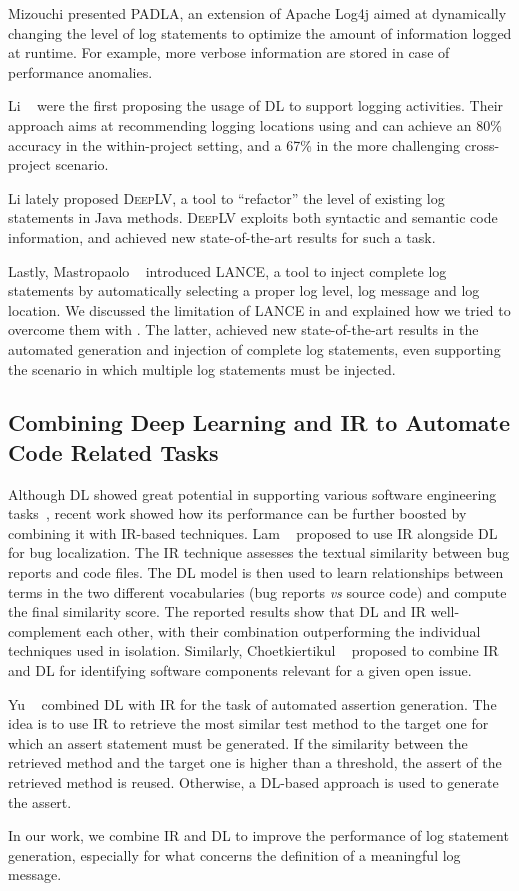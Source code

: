 Mizouchi \etal \cite{mizouchi2019padla} presented \textsc{PADLA}, an extension of Apache Log4j aimed at dynamically changing the level of log statements to optimize the amount of information logged at runtime. For example, more verbose information are stored in case of performance anomalies.

Li \etal~\cite{li2020shall} were the first proposing the usage of DL to support logging activities. Their approach aims at recommending logging locations using and can achieve an 80\% accuracy in the within-project setting, and a 67\% in the more challenging cross-project scenario.

Li \etal \cite{li2021deeplv} lately proposed \textsc{DeepLV}, a tool to ``refactor'' the level of existing log statements in Java methods. \textsc{DeepLV} exploits both syntactic and semantic code information, and achieved new state-of-the-art results for such a task.

Lastly, Mastropaolo \etal~\cite{mastropaolo2022using} introduced \textsc{LANCE}, a tool to inject complete log statements by automatically selecting a proper log level, log message and log location. We discussed the limitation of \textsc{LANCE} in  and explained how we tried to overcome them with \approach. The latter, achieved new state-of-the-art results in the automated generation and injection of complete log statements, even supporting the scenario in which multiple log statements must be injected.

\subsection{Combining Deep Learning and IR to Automate Code Related Tasks}

Although DL showed great potential in supporting various software engineering tasks~\cite{watsonSytematicLiterature2020}, recent work showed how its performance can be further boosted by combining it with IR-based techniques. Lam \etal~\cite{LamBugLocalization2017} proposed to use IR alongside DL for bug localization. The IR technique assesses the textual similarity between bug reports and code files. The DL model is then used to learn relationships between terms in the two different vocabularies (\ie bug reports \emph{vs} source code) and compute the final similarity score. The reported results show that DL and IR well-complement each other, with their combination outperforming the individual techniques used in isolation. Similarly, Choetkiertikul \etal~\cite{choetkiertikul2018predicting} proposed to combine IR and DL for identifying software components relevant for a given open issue.

Yu \etal~\cite{yu2022automated} combined DL with IR for the task of automated assertion generation. The idea is to use IR to retrieve the most similar test method to the target one for which an assert statement must be generated. If the similarity between the retrieved method and the target one is higher than a threshold, the assert of the retrieved method is reused. Otherwise, a DL-based approach is used to generate the assert.

In our work, we combine IR and DL to improve the performance of log statement generation, especially for what concerns the definition of a meaningful log message.